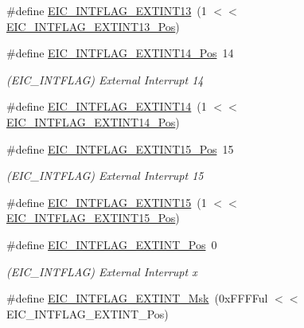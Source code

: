 \begin{DoxyCompactItemize}
\#define \mbox{\hyperlink{group___s_a_m_d21___e_i_c_ga86884768751f15b3f53dbab7fb965873}{E\+I\+C\+\_\+\+I\+N\+T\+F\+L\+A\+G\+\_\+\+E\+X\+T\+I\+N\+T13}}~(1 $<$$<$ \mbox{\hyperlink{group___s_a_m_d21___e_i_c_ga8cfef74a895e1d2b23705ba66b288067}{E\+I\+C\+\_\+\+I\+N\+T\+F\+L\+A\+G\+\_\+\+E\+X\+T\+I\+N\+T13\+\_\+\+Pos}})
\item 
\#define \mbox{\hyperlink{group___s_a_m_d21___e_i_c_ga6eb3f9d8c35bd6ca591f9fb982565df0}{E\+I\+C\+\_\+\+I\+N\+T\+F\+L\+A\+G\+\_\+\+E\+X\+T\+I\+N\+T14\+\_\+\+Pos}}~14
\begin{DoxyCompactList}\small\item\em (E\+I\+C\+\_\+\+I\+N\+T\+F\+L\+AG) External Interrupt 14 \end{DoxyCompactList}\item 
\#define \mbox{\hyperlink{group___s_a_m_d21___e_i_c_ga712f07ef113a89facba545e17f30a58b}{E\+I\+C\+\_\+\+I\+N\+T\+F\+L\+A\+G\+\_\+\+E\+X\+T\+I\+N\+T14}}~(1 $<$$<$ \mbox{\hyperlink{group___s_a_m_d21___e_i_c_ga6eb3f9d8c35bd6ca591f9fb982565df0}{E\+I\+C\+\_\+\+I\+N\+T\+F\+L\+A\+G\+\_\+\+E\+X\+T\+I\+N\+T14\+\_\+\+Pos}})
\item 
\#define \mbox{\hyperlink{group___s_a_m_d21___e_i_c_ga4153dc60db3caf7bc3e136b542f37298}{E\+I\+C\+\_\+\+I\+N\+T\+F\+L\+A\+G\+\_\+\+E\+X\+T\+I\+N\+T15\+\_\+\+Pos}}~15
\begin{DoxyCompactList}\small\item\em (E\+I\+C\+\_\+\+I\+N\+T\+F\+L\+AG) External Interrupt 15 \end{DoxyCompactList}\item 
\#define \mbox{\hyperlink{group___s_a_m_d21___e_i_c_ga5bc136aa774eabd13360841b734d440c}{E\+I\+C\+\_\+\+I\+N\+T\+F\+L\+A\+G\+\_\+\+E\+X\+T\+I\+N\+T15}}~(1 $<$$<$ \mbox{\hyperlink{group___s_a_m_d21___e_i_c_ga4153dc60db3caf7bc3e136b542f37298}{E\+I\+C\+\_\+\+I\+N\+T\+F\+L\+A\+G\+\_\+\+E\+X\+T\+I\+N\+T15\+\_\+\+Pos}})
\item 
\#define \mbox{\hyperlink{group___s_a_m_d21___e_i_c_gadcbc791cf87b0cbd60e76f1958249501}{E\+I\+C\+\_\+\+I\+N\+T\+F\+L\+A\+G\+\_\+\+E\+X\+T\+I\+N\+T\+\_\+\+Pos}}~0
\begin{DoxyCompactList}\small\item\em (E\+I\+C\+\_\+\+I\+N\+T\+F\+L\+AG) External Interrupt x \end{DoxyCompactList}\item 
\#define \mbox{\hyperlink{group___s_a_m_d21___e_i_c_gae66d3b315a5d706346ec79d4e8348b2e}{E\+I\+C\+\_\+\+I\+N\+T\+F\+L\+A\+G\+\_\+\+E\+X\+T\+I\+N\+T\+\_\+\+Msk}}~(0x\+F\+F\+F\+Ful $<$$<$ E\+I\+C\+\_\+\+I\+N\+T\+F\+L\+A\+G\+\_\+\+E\+X\+T\+I\+N\+T\+\_\+\+Pos)

\end{DoxyCompactItemize}
